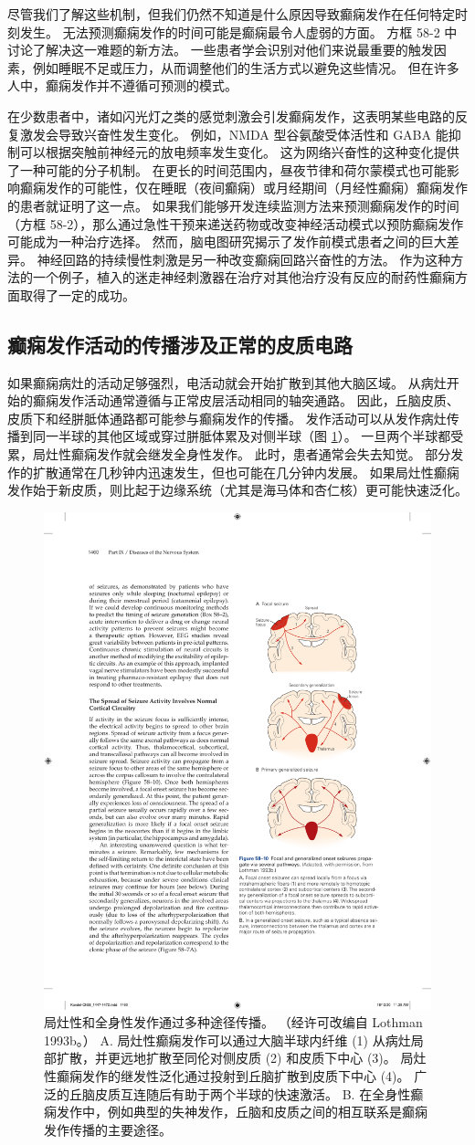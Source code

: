 尽管我们了解这些机制，但我们仍然不知道是什么原因导致癫痫发作在任何特定时刻发生。
无法预测癫痫发作的时间可能是癫痫最令人虚弱的方面。 方框 58-2 中讨论了解决这一难题的新方法。
一些患者学会识别对他们来说最重要的触发因素，例如睡眠不足或压力，从而调整他们的生活方式以避免这些情况。
但在许多人中，癫痫发作并不遵循可预测的模式。


在少数患者中，诸如闪光灯之类的感觉刺激会引发癫痫发作，这表明某些电路的反复激发会导致兴奋性发生变化。
例如，NMDA 型谷氨酸受体活性和 GABA 能抑制可以根据突触前神经元的放电频率发生变化。
这为网络兴奋性的这种变化提供了一种可能的分子机制。
在更长的时间范围内，昼夜节律和荷尔蒙模式也可能影响癫痫发作的可能性，仅在睡眠（夜间癫痫）或月经期间（月经性癫痫）癫痫发作的患者就证明了这一点。
如果我们能够开发连续监测方法来预测癫痫发作的时间（方框 58-2），那么通过急性干预来递送药物或改变神经活动模式以预防癫痫发作可能成为一种治疗选择。
然而，脑电图研究揭示了发作前模式患者之间的巨大差异。
神经回路的持续慢性刺激是另一种改变癫痫回路兴奋性的方法。
作为这种方法的一个例子，植入的迷走神经刺激器在治疗对其他治疗没有反应的耐药性癫痫方面取得了一定的成功。



\subsection{癫痫发作活动的传播涉及正常的皮质电路}

如果癫痫病灶的活动足够强烈，电活动就会开始扩散到其他大脑区域。
从病灶开始的癫痫发作活动通常遵循与正常皮层活动相同的轴突通路。
因此，丘脑皮质、皮质下和经胼胝体通路都可能参与癫痫发作的传播。
发作活动可以从发作病灶传播到同一半球的其他区域或穿过胼胝体累及对侧半球（图 \ref{fig:58_10}）。
一旦两个半球都受累，局灶性癫痫发作就会继发全身性发作。
此时，患者通常会失去知觉。
部分发作的扩散通常在几秒钟内迅速发生，但也可能在几分钟内发展。
如果局灶性癫痫发作始于新皮质，则比起于边缘系统（尤其是海马体和杏仁核）更可能快速泛化。


\begin{figure}[htbp]
	\centering
	\includegraphics[width=0.4\linewidth]{chap58/fig_58_10}
	\caption{局灶性和全身性发作通过多种途径传播。 （经许可改编自 Lothman 1993b。） A. 局灶性癫痫发作可以通过大脑半球内纤维 (1) 从病灶局部扩散，并更远地扩散至同伦对侧皮质 (2) 和皮质下中心 (3)。 局灶性癫痫发作的继发性泛化通过投射到丘脑扩散到皮质下中心 (4)。 广泛的丘脑皮质互连随后有助于两个半球的快速激活。 B. 在全身性癫痫发作中，例如典型的失神发作，丘脑和皮质之间的相互联系是癫痫发作传播的主要途径。}
	\label{fig:58_10}
\end{figure}


